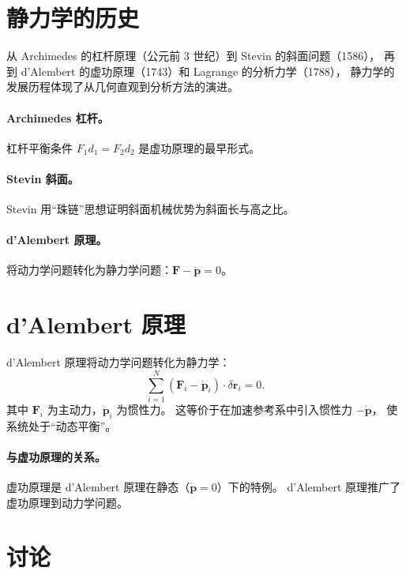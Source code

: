 \documentclass[UTF8,a4paper,11pt]{ctexart}
\begin{document}
\section{静力学的历史}
\label{sec:history-statics}

从 Archimedes 的杠杆原理（公元前 3 世纪）到 Stevin 的斜面问题（1586），
再到 d'Alembert 的虚功原理（1743）和 Lagrange 的分析力学（1788），
静力学的发展历程体现了从几何直观到分析方法的演进。

\paragraph{Archimedes 杠杆。}
杠杆平衡条件 $F_1 d_1=F_2 d_2$ 是虚功原理的最早形式。

\paragraph{Stevin 斜面。}
Stevin 用``珠链''思想证明斜面机械优势为斜面长与高之比。

\paragraph{d'Alembert 原理。}
将动力学问题转化为静力学问题：$\boldsymbol F-\dot{\boldsymbol p}=0$。

\section{d'Alembert 原理}
\label{sec:dalembert}

d'Alembert 原理将动力学问题转化为静力学：
\begin{equation}
  \sum_{i=1}^N (\boldsymbol F_i-\dot{\boldsymbol p}_i)\cdot\delta\boldsymbol r_i=0.
\end{equation}
其中 $\boldsymbol F_i$ 为主动力，$\dot{\boldsymbol p}_i$ 为惯性力。
这等价于在加速参考系中引入惯性力 $-\dot{\boldsymbol p}$，
使系统处于``动态平衡''。

\paragraph{与虚功原理的关系。}
虚功原理是 d'Alembert 原理在静态（$\dot{\boldsymbol p}=0$）下的特例。
d'Alembert 原理推广了虚功原理到动力学问题。

\section{讨论}
\label{sec:discuss}
\end{document}
